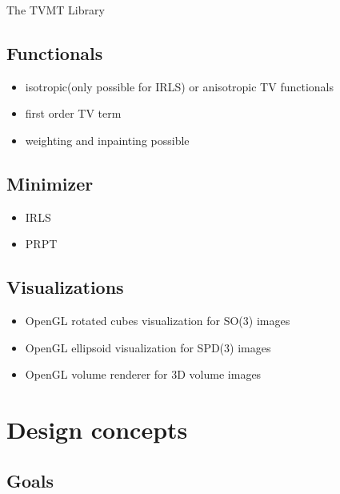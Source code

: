 \begin{chapter}{The TVMT Library}
\subsection{Functionals} %
\label{sub:Functionals}
\begin{itemize}
    \item isotropic(only possible for IRLS) or anisotropic TV functionals
    \item first order TV term
    \item weighting and inpainting possible
\end{itemize}

\subsection{Minimizer} %
\label{sub:Minimizer}
\begin{itemize}
	\item IRLS
	\item PRPT
\end{itemize}

\subsection{Visualizations} %
\label{sub:Visualizations}
\begin{itemize}
    \item OpenGL rotated cubes visualization for SO(3) images
    \item OpenGL ellipsoid visualization for SPD(3) images
    \item OpenGL volume renderer for 3D volume images
\end{itemize}


\section{Design concepts} %
\label{sec:Design}

\subsection{Goals} %
\label{sub:Goals}


\end{chapter}
